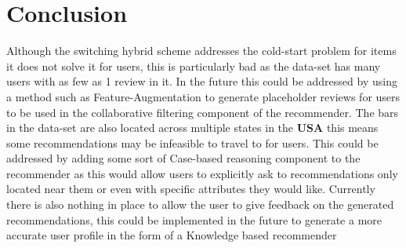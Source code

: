 \documentclass[conference]{IEEEtran}
\begin{document}
\section{Conclusion}
Although the switching hybrid scheme addresses the cold-start problem for items it does not solve it for users, this is particularly bad as the data-set has many users with as few as 1 review in it. In the future this could be addressed by using a method such as Feature-Augmentation\cite{b1} to generate placeholder reviews for users to be used in the collaborative filtering component of the recommender. The bars in the data-set are also located across multiple states in the \textbf{USA} this means some recommendations may be infeasible to travel to for users. This could be addressed by adding some sort of Case-based reasoning component\cite{b2} to the recommender as this would allow users to explicitly ask to recommendations only located near them or even with specific attributes they would like. Currently there is also nothing in place to allow the user to give feedback on the generated recommendations, this could be implemented in the future to generate a more accurate user profile in the form of a Knowledge based recommender\cite{b3}
\end{document}
